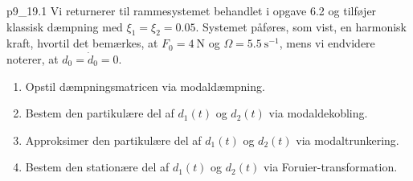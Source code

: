 
\begin{problemwithimage}{p9_1}{9.1}
  Vi returnerer til rammesystemet behandlet i opgave 6.2 og tilføjer klassisk dæmpning med $\xi_1 = \xi_2 = \num{0,05}$.
  Systemet påføres, som vist, en harmonisk kraft, hvortil det bemærkes, at $F_0 = \qty{4}{\N}$ og $\Omega = \qty{5,5}{\s^{-1}}$, mens vi endvidere noterer, at $d_0 = \dot{d}_0 = 0$.

  \begin{enumerate}[label=\alph*)]
    \item Opstil dæmpningsmatricen via modaldæmpning. 
    \item Bestem den partikulære del af $d_1(t)$ og $d_2(t)$ via modaldekobling. 
    \item Approksimer den partikulære del af $d_1(t)$ og $d_2(t)$ via modaltrunkering. 
    \item Bestem den stationære del af $d_1(t)$ og $d_2(t)$ via Foruier-transformation.
  \end{enumerate}
\end{problemwithimage}


